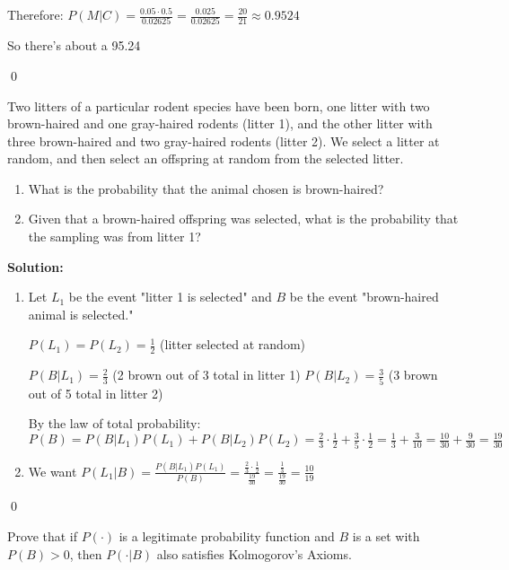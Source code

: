 Therefore:
$P(M|C) = \frac{0.05 \cdot 0.5}{0.02625} = \frac{0.025}{0.02625} = \frac{20}{21} \approx 0.9524$

So there's about a 95.24%



\qed
\begin{problembox}
Two litters of a particular rodent species have been born, one litter with two brown-haired and one gray-haired rodents (litter 1), and the other litter with three brown-haired and two gray-haired rodents (litter 2). We select a litter at random, and then select an offspring at random from the selected litter.
\begin{enumerate}[label=(\alph*)]
    \item What is the probability that the animal chosen is brown-haired?
    \item Given that a brown-haired offspring was selected, what is the probability that the sampling was from litter 1?
\end{enumerate}
\end{problembox}

\noindent\textbf{Solution:}
\begin{enumerate}[label=(\alph*)]
    \item Let $L_1$ be the event "litter 1 is selected" and $B$ be the event "brown-haired animal is selected."
    
    $P(L_1) = P(L_2) = \frac{1}{2}$ (litter selected at random)
    
    $P(B|L_1) = \frac{2}{3}$ (2 brown out of 3 total in litter 1)
    $P(B|L_2) = \frac{3}{5}$ (3 brown out of 5 total in litter 2)
    
    By the law of total probability:
    $P(B) = P(B|L_1)P(L_1) + P(B|L_2)P(L_2) = \frac{2}{3} \cdot \frac{1}{2} + \frac{3}{5} \cdot \frac{1}{2} = \frac{1}{3} + \frac{3}{10} = \frac{10}{30} + \frac{9}{30} = \frac{19}{30}$
    
    \item We want $P(L_1|B) = \frac{P(B|L_1)P(L_1)}{P(B)} = \frac{\frac{2}{3} \cdot \frac{1}{2}}{\frac{19}{30}} = \frac{\frac{1}{3}}{\frac{19}{30}} = \frac{10}{19}$
\end{enumerate}



\qed
\begin{problembox}
Prove that if $P(\cdot)$ is a legitimate probability function and $B$ is a set with $P(B)>0$, then $P(\cdot|B)$ also satisfies Kolmogorov's Axioms.
\end{problembox}

